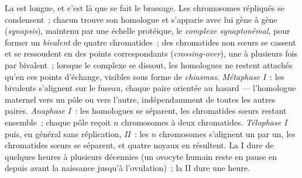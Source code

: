 \begin{proposition}\label{prop:b2:meiosis-heredity:stages}
La \emph{} est longue, et c'est là que se fait le brassage.
Les chromosomes répliqués se condensent~; chacun trouve son homologue et
s'apparie avec lui gène à gène (\emph{synapsis}), maintenu par une
échelle protéique, le \emph{complexe synaptonémal}, pour former un
\emph{bivalent} de quatre chromatides~; des chromatides non sœurs se
cassent et se ressoudent en des points correspondants
(\emph{crossing-over}), une à plusieurs fois par bivalent~; lorsque le
complexe se dissout, les homologues ne restent attachés qu'en ces points
d'échange, visibles sous forme de \emph{chiasmas}.
\emph{Métaphase I}~: les bivalents s'alignent sur le fuseau, chaque
paire orientée au hasard --- l'homologue maternel vers un pôle ou vers
l'autre, indépendamment de toutes les autres paires. \emph{Anaphase I}~:
les homologues se séparent, les chromatides sœurs restant ensemble~;
chaque pôle reçoit $n$ chromosomes à deux chromatides. \emph{Télophase I}
puis, en général sans réplication, \emph{ II}~: les $n$
chromosomes s'alignent un par un, les chromatides sœurs se séparent, et
quatre noyaux  en résultent. La  I dure de quelques
heures à plusieurs décennies (un ovocyte humain reste en pause en
 depuis avant la naissance jusqu'à l'ovulation)~; la  II
dure une heure.
\end{proposition}


